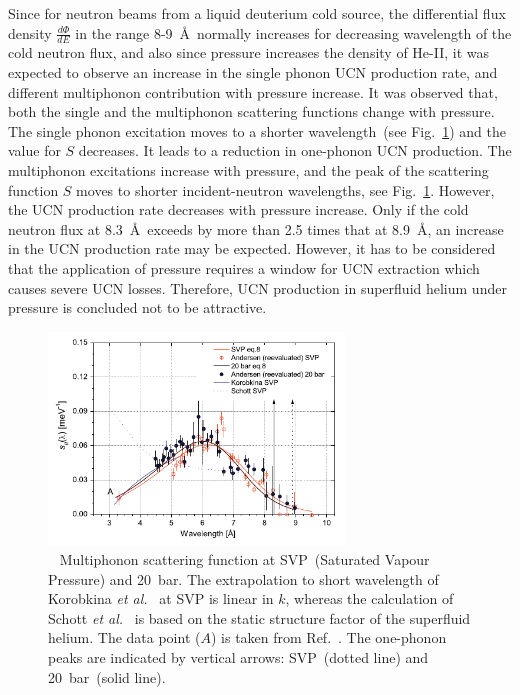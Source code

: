 Since for neutron beams from a liquid deuterium cold source, the
differential flux density $\frac{d\Phi}{dE}$ in the range
8-9~\AA~normally increases for decreasing wavelength of the cold
neutron flux, and also since pressure increases the density of He-II,
it was expected to observe an increase in the single phonon UCN
production rate, and different multiphonon contribution with pressure
increase.  It was observed that, both the single and the multiphonon
scattering functions change with pressure. The single phonon
excitation moves to a shorter wavelength~(see
Fig.~\ref{fig:Schmidt_S}) and the value for $S$ decreases. It leads to
a reduction in one-phonon UCN production.  The multiphonon excitations
increase with pressure, and the peak of the scattering function $S$
moves to shorter incident-neutron wavelengths, see
Fig.~\ref{fig:Schmidt_S}. However, the UCN production rate decreases
with pressure increase.  Only if the cold neutron flux at
8.3~\AA~exceeds by more than 2.5 times that at 8.9~\AA, an increase in
the UCN production rate may be expected. However, it has to be
considered that the application of pressure requires a window for UCN
extraction which causes severe UCN losses. Therefore, UCN production
in superfluid helium under pressure is concluded not to be attractive.




\begin{figure}[h!]
\begin{center}
   \includegraphics[width=0.7\textwidth]{Schmidt_S.PNG}
   \caption{~\cite{Schmidt2009} Multiphonon scattering function at
     SVP~(Saturated Vapour Pressure) and 20~bar. The extrapolation to
     short wavelength of Korobkina {\it {et al.}}~\cite{Korobkina2002}
     at SVP is linear in $k$, whereas the calculation of Schott {\it
       {et al.}}~\cite{Schott2003} is based on the static structure
     factor of the superfluid helium. The data point ($A$) is taken
     from Ref.~\cite{Fak1991}. The one-phonon peaks are indicated by
     vertical arrows: SVP~(dotted line) and 20~bar~(solid line).  }
    \label{fig:Schmidt_S}
    \end{center}
\end{figure} 


